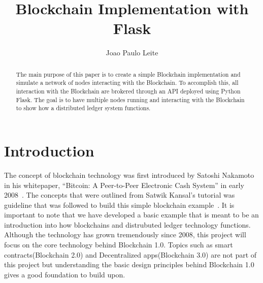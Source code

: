 
\title{Blockchain Implementation with Flask}


\author{Joao Paulo Leite}

\renewcommand{\shortauthors}{J. P. Leite}


\begin{abstract}
  The main purpose of this paper is to create a simple Blockchain
  implementation and simulate a network of nodes interacting with the
  Blockchain. To accomplish this, all interaction with the Blockchain
  are brokered through an API deployed using Python Flask. The goal is
  to have multiple nodes running and interacting with the Blockchain
  to show how a distributed ledger system functions.

\end{abstract}



\maketitle

\section{Introduction}

The concept of blockchain technology was first introduced by Satoshi
Nakamoto in his whitepaper, ``Bitcoin: A Peer-to-Peer Electronic Cash
System'' in early
2008~\cite{hid-sp18-414-www-blockchain-theory-application}.  The
concepts that were outlined from Satwik Kansal's tutorial was guideline that
was followed to build this simple blockchain example~\cite{hid-sp18-414-www-blockchain-example}. 
It is important to note that we have developed a basic example that is meant to be an
introduction into how blockchains and distrubuted ledger technology
functions. Although the technology has grown tremendously since 2008,
this project will focus on the core technology behind Blockchain
1.0. Topics such as smart contracts(Blockchain 2.0) and Decentralized
apps(Blockchain 3.0) are not part of this project but understanding
the basic design principles behind Blockchain 1.0 gives a good
foundation to build upon.

